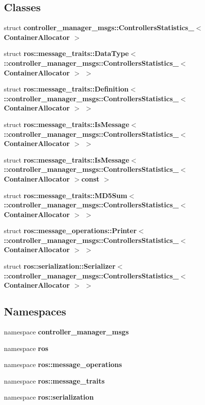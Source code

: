 \subsection*{\-Classes}
\begin{DoxyCompactItemize}
\item 
struct {\bf controller\-\_\-manager\-\_\-msgs\-::\-Controllers\-Statistics\-\_\-$<$ Container\-Allocator $>$}
\item 
struct {\bf ros\-::message\-\_\-traits\-::\-Data\-Type$<$ \-::controller\-\_\-manager\-\_\-msgs\-::\-Controllers\-Statistics\-\_\-$<$ Container\-Allocator $>$ $>$}
\item 
struct {\bf ros\-::message\-\_\-traits\-::\-Definition$<$ \-::controller\-\_\-manager\-\_\-msgs\-::\-Controllers\-Statistics\-\_\-$<$ Container\-Allocator $>$ $>$}
\item 
struct {\bf ros\-::message\-\_\-traits\-::\-Is\-Message$<$ \-::controller\-\_\-manager\-\_\-msgs\-::\-Controllers\-Statistics\-\_\-$<$ Container\-Allocator $>$ $>$}
\item 
struct {\bf ros\-::message\-\_\-traits\-::\-Is\-Message$<$ \-::controller\-\_\-manager\-\_\-msgs\-::\-Controllers\-Statistics\-\_\-$<$ Container\-Allocator $>$const  $>$}
\item 
struct {\bf ros\-::message\-\_\-traits\-::\-M\-D5\-Sum$<$ \-::controller\-\_\-manager\-\_\-msgs\-::\-Controllers\-Statistics\-\_\-$<$ Container\-Allocator $>$ $>$}
\item 
struct {\bf ros\-::message\-\_\-operations\-::\-Printer$<$ \-::controller\-\_\-manager\-\_\-msgs\-::\-Controllers\-Statistics\-\_\-$<$ Container\-Allocator $>$ $>$}
\item 
struct {\bf ros\-::serialization\-::\-Serializer$<$ \-::controller\-\_\-manager\-\_\-msgs\-::\-Controllers\-Statistics\-\_\-$<$ Container\-Allocator $>$ $>$}
\end{DoxyCompactItemize}
\subsection*{\-Namespaces}
\begin{DoxyCompactItemize}
\item 
namespace {\bf controller\-\_\-manager\-\_\-msgs}
\item 
namespace {\bf ros}
\item 
namespace {\bf ros\-::message\-\_\-operations}
\item 
namespace {\bf ros\-::message\-\_\-traits}
\item 
namespace {\bf ros\-::serialization}
\end{DoxyCompactItemize}
